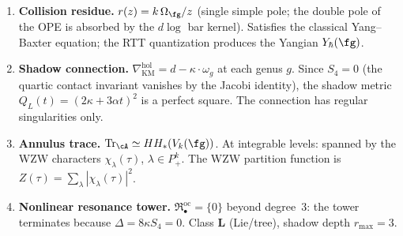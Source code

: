 \begin{computation}
\begin{enumerate}[label=\textup{(\roman*)},nosep]
\item \textbf{Collision residue.}
 $r(z) = k\,\Omega_\fg / z$
 \textup{(}single simple pole; the double pole of the OPE is
 absorbed by the $d\log$ bar kernel\textup{)}.
 Satisfies the classical Yang--Baxter equation; the RTT
 quantization produces the Yangian $Y_\hbar(\fg)$.

\item \textbf{Shadow connection.}
 $\nabla^{\mathrm{hol}}_{\mathrm{KM}} = d - \kappa \cdot \omega_g$
 at each genus $g$. Since $S_4 = 0$ (the quartic contact invariant
 vanishes by the Jacobi identity), the shadow metric
 $Q_L(t) = (2\kappa + 3\alpha t)^2$ is a perfect square.
 The connection has regular singularities only.

\item \textbf{Annulus trace.}
 $\mathrm{Tr}_\cA \simeq HH_*(V_k(\fg))$.
 At integrable levels: spanned by the WZW characters
 $\chi_\lambda(\tau)$, $\lambda \in P_+^k$.
 The WZW partition function is
 $Z(\tau) = \sum_\lambda |\chi_\lambda(\tau)|^2$.

\item \textbf{Nonlinear resonance tower.}
 $\mathfrak{R}^{\mathrm{oc}}_\bullet = \{0\}$
 beyond degree~$3$: the tower terminates because
 $\Delta = 8\kappa S_4 = 0$.
 Class $\mathbf{L}$ (Lie/tree), shadow depth $r_{\max} = 3$.
\end{enumerate}
\end{computation}

